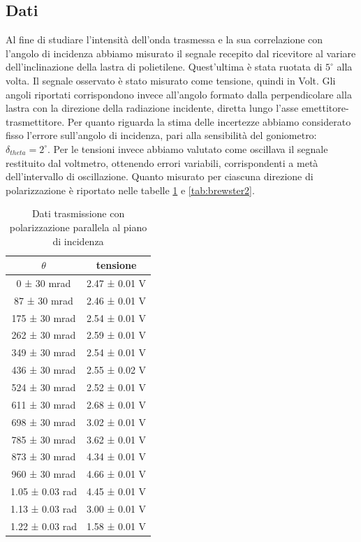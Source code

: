 \documentclass[a4paper]{article}
\begin{document}
\subsection{Dati}
Al fine di studiare l'intensità dell'onda trasmessa e la sua correlazione con l'angolo di incidenza abbiamo misurato il segnale recepito dal ricevitore al variare dell'inclinazione della lastra di polietilene. Quest'ultima è stata ruotata di $5^\circ$ alla volta. Il segnale osservato è stato misurato come tensione, quindi in Volt. Gli angoli riportati corrispondono invece all'angolo formato dalla perpendicolare alla lastra con la direzione della radiazione incidente, diretta lungo l'asse emettitore-trasmettitore. Per quanto riguarda la stima delle incertezze abbiamo considerato fisso l'errore sull'angolo di incidenza, pari alla sensibilità del goniometro: $\delta_{theta}=2^\circ$. Per le tensioni invece abbiamo valutato come oscillava il segnale restituito dal voltmetro, ottenendo errori variabili, corrispondenti a metà dell'intervallo di oscillazione. Quanto misurato per ciascuna direzione di polarizzazione è riportato nelle tabelle \ref{tab:brewster1} e \ref{tab:brewster2}.

\begin{table}[htbp]
\centering
\begin{tabular}{|c|c|}
\hline
$\theta$ & tensione \\\hline\hline
0 ± 30 mrad & 2.47 ± 0.01 V \\
87 ± 30 mrad & 2.46 ± 0.01 V \\
175 ± 30 mrad & 2.54 ± 0.01 V \\
262 ± 30 mrad & 2.59 ± 0.01 V \\
349 ± 30 mrad & 2.54 ± 0.01 V \\
436 ± 30 mrad & 2.55 ± 0.02 V \\
524 ± 30 mrad & 2.52 ± 0.01 V \\
611 ± 30 mrad & 2.68 ± 0.01 V \\
698 ± 30 mrad & 3.02 ± 0.01 V \\
785 ± 30 mrad & 3.62 ± 0.01 V \\
873 ± 30 mrad & 4.34 ± 0.01 V \\
960 ± 30 mrad & 4.66 ± 0.01 V \\
1.05 ± 0.03 rad & 4.45 ± 0.01 V \\
1.13 ± 0.03 rad & 3.00 ± 0.01 V \\
1.22 ± 0.03 rad & 1.58 ± 0.01 V \\
\hline
\end{tabular}
\caption{Dati trasmissione con polarizzazione parallela al piano di incidenza}
\label{tab:brewster1}
\end{table}
\end{document}
